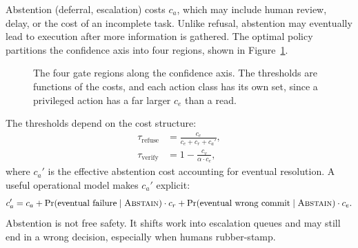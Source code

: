 \documentclass[11pt]{book}
\begin{document}
Abstention (deferral, escalation) costs $c_a$, which may include human review, delay, or the cost of an incomplete task. Unlike refusal, abstention may eventually lead to execution after more information is gathered. The optimal policy partitions the confidence axis into four regions, shown in Figure~\ref{fig:confidence-regions}.

\begin{figure}[htbp]
\centering
{}
\caption{The four gate regions along the confidence axis. The thresholds are functions of the costs, and each action class has its own set, since a privileged action has a far larger $c_e$ than a read.}
\label{fig:confidence-regions}
\end{figure}

The thresholds depend on the cost structure:
\begin{align*}
\tau_{\text{refuse}} &= \frac{c_e}{c_e + c_r + c_a'}, \\
\tau_{\text{verify}} &= 1 - \frac{c_v}{\alpha \cdot c_e},
\end{align*}
where $c_a'$ is the effective abstention cost accounting for eventual resolution. A useful operational model makes $c_a'$ explicit:
\[
c_a' = c_a + \Pr(\text{eventual failure} \mid \textsc{Abstain}) \cdot c_r + \Pr(\text{eventual wrong commit} \mid \textsc{Abstain}) \cdot c_e.
\]
Abstention is not free safety. It shifts work into escalation queues and may still end in a wrong decision, especially when humans rubber-stamp.
\end{document}
